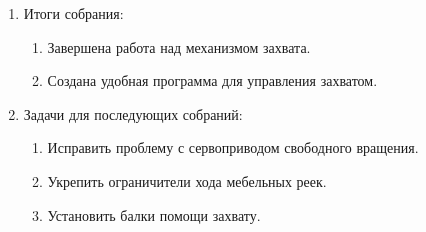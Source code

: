 \begin{enumerate}
\begin{enumerate}
    \end{enumerate}
    
	\item Итоги собрания: 
	\begin{enumerate}
	  \item Завершена работа над механизмом захвата.
	  
      \item Создана удобная программа для управления захватом.
      
    \end{enumerate}
    
	\item Задачи для последующих собраний:
	\begin{enumerate}
	  \item Исправить проблему с сервоприводом свободного вращения.
	  
	  \item Укрепить ограничители хода мебельных реек.
	  
	  \item Установить балки помощи захвату.

    \end{enumerate}     
\end{enumerate}
\fillpage
